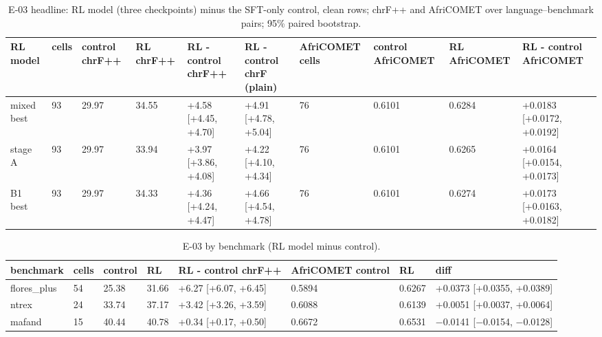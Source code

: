 \begin{table}[t]
\centering\scriptsize
\setlength{\tabcolsep}{4pt}
\caption{E-03 headline: RL model (three checkpoints) minus the SFT-only control, clean rows; chrF++ and AfriCOMET over language--benchmark pairs; 95\% paired bootstrap.}\label{tab:e03-headline}
\begin{adjustbox}{max width=\linewidth}\begin{tabular}{@{}llllllllll@{}}
\toprule
RL model & cells & control chrF++ & RL chrF++ & RL - control chrF++ & RL - control chrF (plain) & AfriCOMET cells & control AfriCOMET & RL AfriCOMET & RL - control AfriCOMET \\
\midrule
mixed best & 93 & 29.97 & 34.55 & +4.58 [+4.45, +4.70] & +4.91 [+4.78, +5.04] & 76 & 0.6101 & 0.6284 & +0.0183 [+0.0172, +0.0192] \\
stage A & 93 & 29.97 & 33.94 & +3.97 [+3.86, +4.08] & +4.22 [+4.10, +4.34] & 76 & 0.6101 & 0.6265 & +0.0164 [+0.0154, +0.0173] \\
B1 best & 93 & 29.97 & 34.33 & +4.36 [+4.24, +4.47] & +4.66 [+4.54, +4.78] & 76 & 0.6101 & 0.6274 & +0.0173 [+0.0163, +0.0182] \\
\bottomrule
\end{tabular}\end{adjustbox}
\end{table}

\begin{table}[t]
\centering\footnotesize
\setlength{\tabcolsep}{4pt}
\caption{E-03 by benchmark (RL model minus control).}\label{tab:e03-bench}
\begin{adjustbox}{max width=\linewidth}\begin{tabular}{@{}llllllll@{}}
\toprule
benchmark & cells & control & RL & RL - control chrF++ & AfriCOMET control & RL & diff \\
\midrule
flores\_plus & 54 & 25.38 & 31.66 & +6.27 [+6.07, +6.45] & 0.5894 & 0.6267 & +0.0373 [+0.0355, +0.0389] \\
ntrex & 24 & 33.74 & 37.17 & +3.42 [+3.26, +3.59] & 0.6088 & 0.6139 & +0.0051 [+0.0037, +0.0064] \\
mafand & 15 & 40.44 & 40.78 & +0.34 [+0.17, +0.50] & 0.6672 & 0.6531 & \ensuremath{-}0.0141 [\ensuremath{-}0.0154, \ensuremath{-}0.0128] \\
\bottomrule
\end{tabular}\end{adjustbox}
\end{table}

